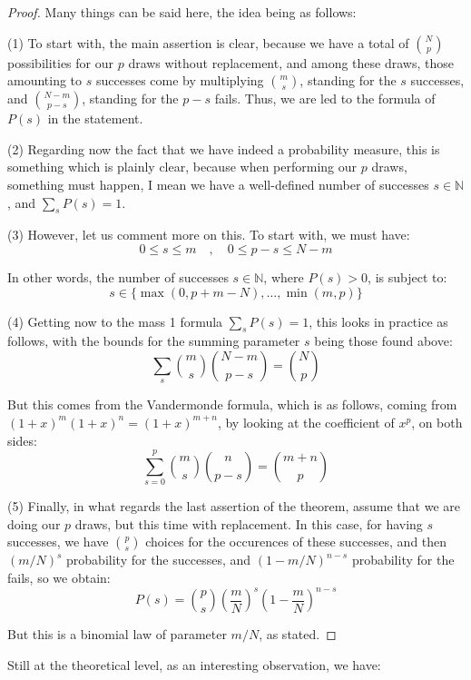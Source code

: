 \documentclass[12pt]{amsbook}
\begin{document}
\begin{proof}
Many things can be said here, the idea being as follows:

\medskip

(1) To start with, the main assertion is clear, because we have a total of $\binom{N}{p}$ possibilities for our $p$ draws without replacement, and among these draws, those amounting to $s$ successes come by multiplying $\binom{m}{s}$, standing for the $s$ successes, and $\binom{N-m}{p-s}$, standing for the $p-s$ fails. Thus, we are led to the formula of $P(s)$ in the statement.

\medskip

(2) Regarding now the fact that we have indeed a probability measure, this is something which is plainly clear, because when performing our $p$ draws, something must happen, I mean we have a well-defined number of successes $s\in\mathbb N$, and $\sum_sP(s)=1$.

\medskip

(3) However, let us comment more on this. To start with, we must have:
$$0\leq s\leq m\quad,\quad 0\leq p-s\leq N-m$$

In other words, the number of successes $s\in\mathbb N$, where $P(s)>0$, is subject to:
$$s\in\{\max(0,p+m-N),\ldots,\min(m,p)\}$$

(4) Getting now to the mass 1 formula $\sum_sP(s)=1$, this looks in practice as follows, with the bounds for the summing parameter $s$ being those found above:
$$\sum_s\binom{m}{s}\binom{N-m}{p-s}=\binom{N}{p}$$

But this comes from the Vandermonde formula, which is as follows, coming from $(1+x)^m(1+x)^n=(1+x)^{m+n}$, by looking at the coefficient of $x^p$, on both sides:
$$\sum_{s=0}^p\binom{m}{s}\binom{n}{p-s}=\binom{m+n}{p}$$

(5) Finally, in what regards the last assertion of the theorem, assume that we are doing our $p$ draws, but this time with replacement. In this case, for having $s$ successes, we have $\binom{p}{s}$ choices for the occurences of these successes, and then $(m/N)^s$ probability for the successes, and $(1-m/N)^{n-s}$ probability for the fails, so we obtain:
$$P(s)=\binom{p}{s}\left(\frac{m}{N}\right)^s\left(1-\frac{m}{N}\right)^{n-s}$$

But this is a binomial law of parameter $m/N$, as stated.
\end{proof}

Still at the theoretical level, as an interesting observation, we have:
\end{document}
